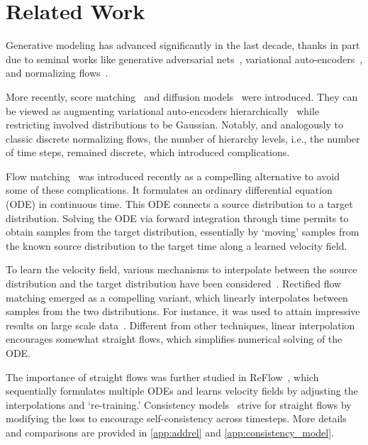 \section{Related Work}
\label{sec:rel}

Generative modeling has advanced significantly in the last decade, thanks in part due to seminal works like generative adversarial nets~\citep{goodfellow2014generative}, variational auto-encoders~\citep{KingmaICLR2014}, and normalizing flows~\citep{rezende2015variational}.

More recently, score matching~\citep{song2019generative} and diffusion models~\citep{ho2020denoising} were introduced. They can be viewed as augmenting variational auto-encoders hierarchically~\citep{luo2022understanding} while restricting involved distributions to be Gaussian. Notably, and analogously to classic discrete normalizing flows, the number of hierarchy levels, i.e., the number of time steps, remained discrete, which introduced complications.

Flow matching~\citep{LipmanICLR2023} was introduced recently as a compelling alternative to avoid some of these complications. It formulates an ordinary differential equation (ODE) in continuous time. This ODE connects a source distribution to a target distribution. Solving the ODE via forward integration through time permits to obtain samples from the target distribution, essentially by `moving' samples from the known source distribution to the target time along a learned velocity field.

To learn the velocity field, various mechanisms to interpolate between the source distribution and the target distribution have been considered~\citep{LipmanICLR2023, liu2023flow, tongimproving}. Rectified flow matching emerged as a compelling variant, which linearly interpolates between samples from the two distributions. For instance, it was used to attain impressive results on large scale data~\citep{ma2024sit, esser2024scaling}. Different from other techniques, linear interpolation encourages somewhat straight flows, which simplifies numerical solving of the ODE.

The importance of straight flows was further studied in ReFlow~\citep{liu2023flow}, which sequentially formulates multiple ODEs and learns velocity fields by adjusting the interpolations and `re-training.'
Consistency models~\citep{song2023consistency, kimconsistency, yang2024consistency} strive for straight flows by modifying the loss to encourage self-consistency across timesteps. More details and comparisons are provided in \cref{app:addrel} and \ref{app:consistency_model}.


